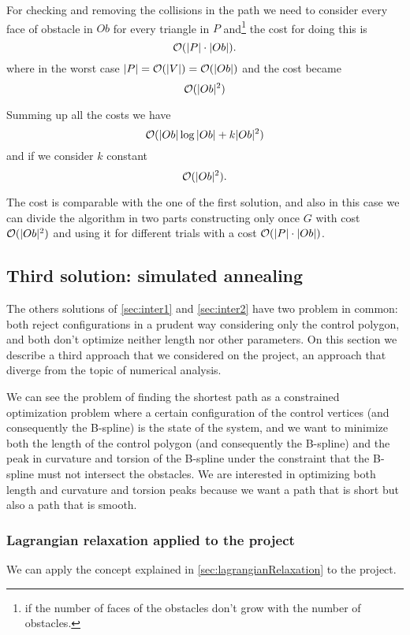 \documentclass[dissertation.tex]{subfiles}
\begin{document}
For checking and removing the collisions in the path we need to
consider every face of obstacle in $Ob$ for every
triangle in $P$ and\footnote{if the
  number of faces of the obstacles don't grow with the number of
  obstacles.} the cost for doing this is
\begin{equation*}
  \mathcal{O}(|P|\cdot|Ob|).
\end{equation*}
where in the worst case $|P|=\mathcal{O}(|V|)=\mathcal{O}(|Ob|)$ and the cost
became
\begin{equation*}
  \mathcal{O}(|Ob|^2)
\end{equation*}

Summing up all the costs we have 
\begin{equation*}
  \mathcal{O}(|Ob|\log|Ob|+k|Ob|^2)
\end{equation*}
and if we consider $k$ constant
\begin{equation*}
  \mathcal{O}(|Ob|^2).
\end{equation*}

The cost is comparable with the one of the first solution, and also in
this case we can divide the algorithm in two parts constructing only
once $G$ with cost $\mathcal{O}(|Ob|^2)$ and using it for different
trials with a cost $\mathcal{O}(|P|\cdot|Ob|)$.

\subsection{Third solution: simulated annealing}\label{sec:inter3}
The others solutions of \cref{sec:inter1} and \cref{sec:inter2} have two
problem in common: both reject configurations in a prudent way
considering only the control polygon, and both don't optimize neither
length nor other parameters. On this section we describe a third
approach that we considered on the project, an approach that diverge
from the topic of numerical analysis.

We can see the problem of finding the shortest path as a constrained
optimization problem where a certain configuration of the control
vertices (and
consequently the B-spline) is the state of the system, and we want to
minimize both the length of the control polygon (and consequently the
B-spline) and the peak in curvature and torsion of the B-spline under
the constraint that the B-spline must not intersect the obstacles. We
are interested in optimizing both length and curvature and torsion
peaks because we want a path that is short but also a path that is
smooth.

\subsubsection{Lagrangian relaxation applied to the project}
We can apply the concept explained in \cref{sec:lagrangianRelaxation}
to the project.
\end{document}
